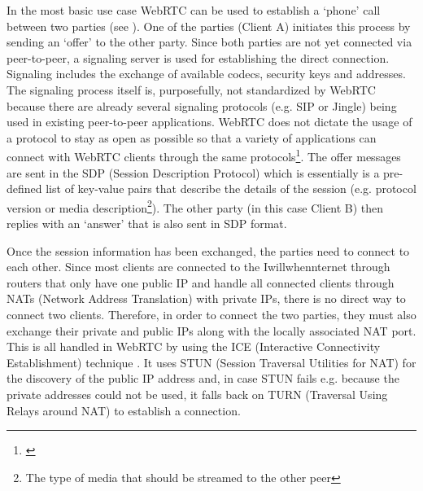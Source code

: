 In the most basic use case WebRTC can be used to establish a `phone' call between two parties (see ). One of the parties (Client A) initiates this process by sending an `offer' to the other party. Since both parties are not yet connected via peer-to-peer, a signaling server is used for establishing the direct connection. Signaling includes the exchange of available codecs, security keys and addresses. The signaling process itself is, purposefully, not standardized by WebRTC because there are already several signaling protocols (e.g. SIP or Jingle) being used in existing peer-to-peer applications. WebRTC does not dictate the usage of a protocol to stay as open as possible so that a variety of applications can connect with WebRTC clients through the same protocols\footnote{\cite[p. 320ff]{grigorik2013high}}. The offer messages are sent in the SDP (Session Description Protocol) which is essentially is a pre-defined list of key-value pairs that describe the details of the session (e.g. protocol version or media description\footnote{The type of media that should be streamed to the other peer}). The other party (in this case Client B) then replies with an `answer' that is also sent in SDP format.

Once the session information has been exchanged, the parties need to connect to each other. Since most clients are connected to the Iwillwhennternet through routers that only have one public IP and handle all connected clients through NATs (Network Address Translation) with private IPs, there is no direct way to connect two clients. Therefore, in order to connect the two parties, they must also exchange their private and public IPs along with the locally associated NAT port. This is all handled in WebRTC by using the ICE (Interactive Connectivity Establishment) technique \cite[p. 50f]{johnston2012webrtc}. It uses STUN (Session Traversal Utilities for NAT) for the discovery of the public IP address and, in case STUN fails e.g. because the private addresses could not be used, it falls back on TURN (Traversal Using Relays around NAT) to establish a connection.

